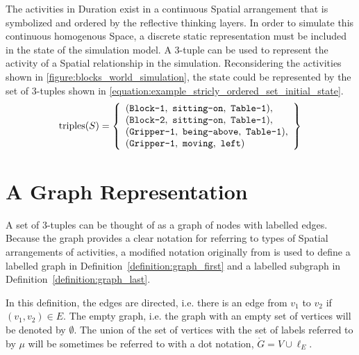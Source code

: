 The activities in Duration exist in a continuous Spatial arrangement
that is symbolized and ordered by the reflective thinking layers.  In
order to simulate this continuous homogenous Space, a discrete static
representation must be included in the state of the simulation model.
A 3-tuple can be used to represent the activity of a Spatial
relationship in the simulation.  Reconsidering the activities shown in
{\mbox{\autoref{figure:blocks_world_simulation}}}, the state could be
represented by the set of 3-tuples shown in
{\mbox{\autoref{equation:example_stricly_ordered_set_initial_state}}}.
\begin{equation}
\label{equation:example_stricly_ordered_set_initial_state}
\text{triples}(S) =
  \left\{
    \begin{array}{l}
      (\text{\tt{Block-1}},   ~\text{\tt{sitting-on}},  ~\text{\tt{Table-1}}), \\
      (\text{\tt{Block-2}},   ~\text{\tt{sitting-on}},  ~\text{\tt{Table-1}}), \\
      (\text{\tt{Gripper-1}}, ~\text{\tt{being-above}}, ~\text{\tt{Table-1}}), \\
      (\text{\tt{Gripper-1}}, ~\text{\tt{moving}},      ~\text{\tt{left}})
    \end{array}
  \right\}
\end{equation}

\section{A Graph Representation}

A set of 3-tuples can be thought of as a graph of nodes with labelled
edges.  Because the graph provides a clear notation for referring to
types of Spatial arrangements of activities, a modified notation
originally from {\mbox{\cite{messmer:1995}}} is used to define a
labelled graph in {\mbox{Definition~\ref{definition:graph_first}}} and
a labelled subgraph in
{\mbox{Definition~\ref{definition:graph_last}}}.

 \noindent In this definition, the edges are
directed, i.e. there is an edge from $v_1$ to $v_2$ if $(v_1,
v_2){\in}E$.  The empty graph, i.e. the graph with an empty set of
vertices will be denoted by $\emptyset$.  The union of the set of
vertices with the set of labels referred to by $\mu$ will be sometimes
be referred to with a dot notation, $\mathring{G}=V {\cup} \ell_E$.


